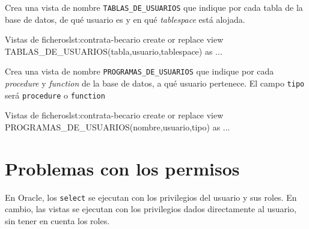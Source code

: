 \begin{homeworkProblem}
  Crea una vista de nombre \texttt{TABLAS\_DE\_USUARIOS} que indique por cada tabla de la base de datos, de qué usuario es y en qué \textit{tablespace} está alojada.

\begin{listadosql}{Vistas de ficheros}{lst:contrata-becario}
create or replace view TABLAS_DE_USUARIOS(tabla,usuario,tablespace) as ...
\end{listadosql}
  
\end{homeworkProblem}


\begin{homeworkProblem}
  Crea una vista de nombre \texttt{PROGRAMAS\_DE\_USUARIOS} que indique por cada \textit{procedure} y \textit{function} de la base de datos, a qué usuario pertenece. El campo \texttt{tipo} será \texttt{procedure} o \texttt{function}

\begin{listadosql}{Vistas de ficheros}{lst:contrata-becario}
create or replace view PROGRAMAS_DE_USUARIOS(nombre,usuario,tipo) as ...
\end{listadosql}
  
\end{homeworkProblem}

\section{Problemas con los permisos}
En Oracle, los \texttt{select} se ejecutan con los privilegios del usuario y sus roles. En cambio, las vistas se ejecutan con los privilegios dados directamente al usuario, sin tener en cuenta los roles. 

